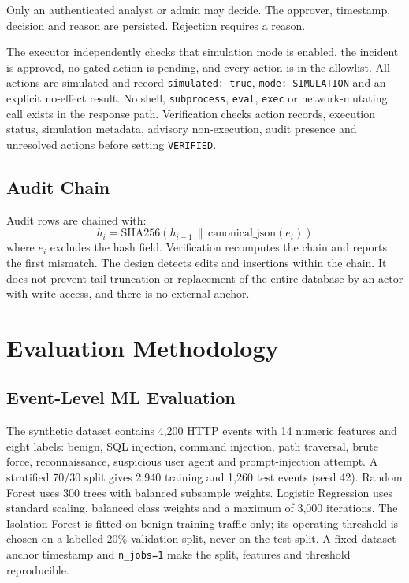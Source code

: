 \documentclass[10pt,twocolumn]{article}
\begin{document}
Only an authenticated analyst or admin may decide. The approver, timestamp, decision and reason are persisted. Rejection requires a reason.

The executor independently checks that simulation mode is enabled, the incident is approved, no gated action is pending, and every action is in the allowlist. All actions are simulated and record \texttt{simulated: true}, \texttt{mode: SIMULATION} and an explicit no-effect result. No shell, \texttt{subprocess}, \texttt{eval}, \texttt{exec} or network-mutating call exists in the response path. Verification checks action records, execution status, simulation metadata, advisory non-execution, audit presence and unresolved actions before setting \texttt{VERIFIED}.

\subsection{Audit Chain}

Audit rows are chained with:
\begin{equation}
h_i = \text{SHA256}(h_{i-1} \,\|\, \text{canonical\_json}(e_i))
\end{equation}
where $e_i$ excludes the hash field. Verification recomputes the chain and reports the first mismatch. The design detects edits and insertions within the chain. It does not prevent tail truncation or replacement of the entire database by an actor with write access, and there is no external anchor.

\section{Evaluation Methodology}

\subsection{Event-Level ML Evaluation}

The synthetic dataset contains 4,200 HTTP events with 14 numeric features and eight labels: benign, SQL injection, command injection, path traversal, brute force, reconnaissance, suspicious user agent and prompt-injection attempt. A stratified 70/30 split gives 2,940 training and 1,260 test events (seed 42). Random Forest uses 300 trees with balanced subsample weights. Logistic Regression uses standard scaling, balanced class weights and a maximum of 3,000 iterations. The Isolation Forest is fitted on benign training traffic only; its operating threshold is chosen on a labelled 20\% validation split, never on the test split. A fixed dataset anchor timestamp and \texttt{n\_jobs=1} make the split, features and threshold reproducible.
\end{document}
